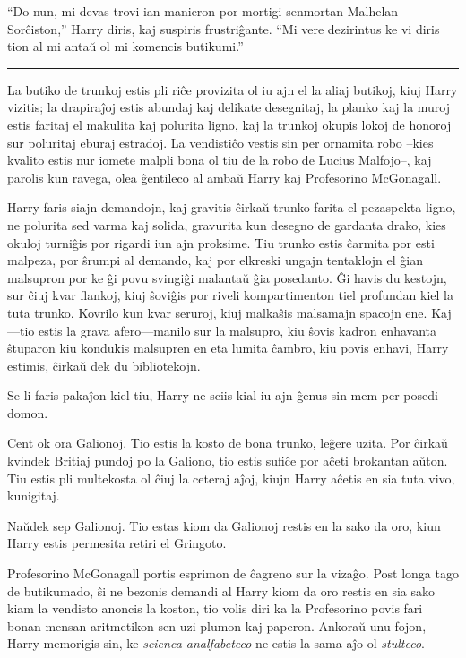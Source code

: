 ``Do nun, mi devas trovi ian manieron por mortigi senmortan Malhelan
Sorĉiston,'' Harry diris, kaj suspiris frustriĝante. ``Mi vere
dezirintus ke vi diris tion al mi antaŭ ol mi komencis butikumi.''

\begin{center}\rule{3in}{0.4pt}\end{center}

La butiko de trunkoj estis pli riĉe provizita ol iu ajn el la aliaj
butikoj, kiuj Harry vizitis; la drapiraĵoj estis abundaj kaj delikate
desegnitaj, la planko kaj la muroj estis faritaj el makulita kaj
polurita ligno, kaj la trunkoj okupis lokoj de honoroj sur poluritaj
eburaj estradoj. La vendistiĉo vestis sin per ornamita robo --kies
kvalito estis nur iomete malpli bona ol tiu de la robo de Lucius
Malfojo--, kaj parolis kun ravega, olea ĝentileco al ambaŭ Harry kaj
Profesorino McGonagall.

Harry faris siajn demandojn, kaj gravitis ĉirkaŭ trunko farita el
pezaspekta ligno, ne polurita sed varma kaj solida, gravurita kun
desegno de gardanta drako, kies okuloj turniĝis por rigardi iun ajn
proksime. Tiu trunko estis ĉarmita por esti malpeza, por ŝrumpi al
demando, kaj por elkreski ungajn tentaklojn el ĝian malsupron por ke
ĝi povu svingiĝi malantaŭ ĝia posedanto. Ĝi havis du kestojn, sur ĉiuj
kvar flankoj, kiuj ŝoviĝis por riveli kompartimenton tiel profundan
kiel la tuta trunko. Kovrilo kun kvar seruroj, kiuj malkaŝis malsamajn
spacojn ene. Kaj—tio estis la grava afero—manilo sur la malsupro, kiu
ŝovis kadron enhavanta ŝtuparon kiu kondukis malsupren en eta lumita
ĉambro, kiu povis enhavi, Harry estimis, ĉirkaŭ dek du bibliotekojn.

Se li faris pakaĵon kiel tiu, Harry ne sciis kial iu ajn ĝenus sin mem
per posedi domon.

Cent ok ora Galionoj. Tio estis la kosto de bona trunko, leĝere
uzita. Por ĉirkaŭ kvindek Britiaj pundoj po la Galiono, tio estis sufiĉe
por aĉeti brokantan aŭton. Tiu estis pli multekosta ol ĉiuj la ceteraj
aĵoj, kiujn Harry aĉetis en sia tuta vivo, kunigitaj.

Naŭdek sep Galionoj. Tio estas kiom da Galionoj restis en la sako da
oro, kiun Harry estis permesita retiri el Gringoto.

Profesorino McGonagall portis esprimon de ĉagreno sur la vizaĝo. Post
longa tago de butikumado, ŝi ne bezonis demandi al Harry kiom da oro
restis en sia sako kiam la vendisto anoncis la koston, tio volis diri
ka la Profesorino povis fari bonan mensan aritmetikon sen uzi plumon
kaj paperon. Ankoraŭ unu fojon, Harry memorigis sin, ke \emph{scienca
  analfabeteco} ne estis la sama aĵo ol \emph{stulteco}.

